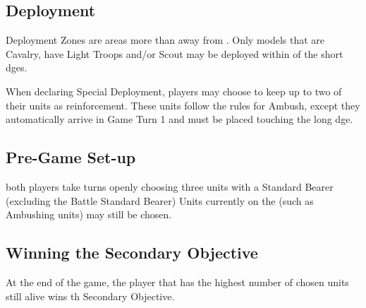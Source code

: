 
\label{Despoilers}


\subsection*{Deployment}

Deployment Zones are areas more than  away from . Only models that are Cavalry, have Light Troops and/or Scout may be deployed within  of the short dges.

When declaring Special Deployment, players may choose to keep up to two of their units as reinforcement. These units follow the rules for Ambush, except  they automatically arrive in Game Turn 1\rewordedrule{,} and must be placed touching the  long dge.


\subsection*{Pre-Game Set-up}

 both players take turns  openly choosing three units with a Standard Bearer (excluding the Battle Standard Bearer) Units currently  on the  (such as Ambushing units) may still be chosen.

\subsection*{Winning the Secondary Objective}

At the end of the game, the player that has the highest number of  chosen units still alive wins th Secondary Objective.

